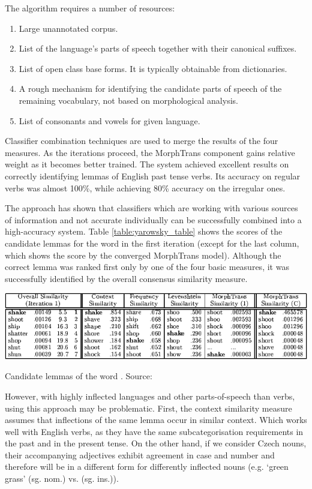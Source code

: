 \noindent The algorithm requires a number of resources:
\begin{enumerate}
\item Large unannotated corpus.
\item List of the language's parts of speech together with their canonical suffixes. 
\item List of open class base forms. It is typically obtainable from dictionaries.
\item A rough mechanism for identifying the candidate parts of speech
of the remaining vocabulary, not based on morphological analysis.
\item List of consonants and vowels for given language.
\end{enumerate}

\noindent Classifier combination techniques are used to merge the results of the four measures. As the iterations proceed, the MorphTrans component gains relative weight as it becomes better trained. The system achieved excellent results on correctly identifying lemmas of English past tense verbs. Its accuracy on regular verbs was almost 100\%, while achieving 80\% accuracy on the irregular ones.

The approach has shown that classifiers which are working with various sources of information and not accurate individually can be successfully combined into a high-accuracy system. Table \ref{table:yarowsky_table} shows the scores of the candidate lemmas for the word  in the first iteration (except for the last column, which shows the score by the converged MorphTrans model). Although the correct lemma  was ranked first only by one of the four basic measures, it was successfully identified by the overall consensus similarity measure.

\begin{table}[h]
\centering
\includegraphics[scale=0.75]{yAw_table.png}
\caption{Candidate lemmas of the word . Source: \citep{yarowsky00}}
\label{table:yarowsky_table}
\end{table}

However, with highly inflected languages and other parts-of-speech than verbs, using this approach may be problematic. First, the context similarity measure assumes that inflections of the same lemma occur in similar context. Which works well with English verbs, as they have the same subcategorisation requirements in the past and in the present tense. On the other hand, if we consider Czech nouns, their accompanying adjectives exhibit agreement in case and number and therefore will be in a different form for differently inflected nouns (e.g.  `green grass' (sg. nom.) vs.  (sg. ins.)).

